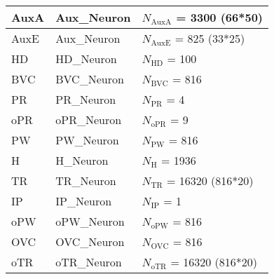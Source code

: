 \documentclass{article}
\begin{document}
\begin{tabularx}{\linewidth}{|l|l|X|}
    AuxA             & Aux\_Neuron        & $N_{\text{AuxA}}$ = 3300 (66*50)  \\ \hline

    AuxE             & Aux\_Neuron        & $N_{\text{AuxE}}$ = 825 (33*25)  \\ \hline

    HD             & HD\_Neuron        & $N_{\text{HD}}$ = 100  \\ \hline

    BVC             & BVC\_Neuron        & $N_{\text{BVC}}$ = 816  \\ \hline

    PR             & PR\_Neuron        & $N_{\text{PR}}$ = 4  \\ \hline

    oPR             & oPR\_Neuron        & $N_{\text{oPR}}$ = 9  \\ \hline

    PW             & PW\_Neuron        & $N_{\text{PW}}$ = 816  \\ \hline

    H             & H\_Neuron        & $N_{\text{H}}$ = 1936  \\ \hline

    TR             & TR\_Neuron        & $N_{\text{TR}}$ = 16320 (816*20)  \\ \hline

    IP             & IP\_Neuron        & $N_{\text{IP}}$ = 1  \\ \hline

    oPW             & oPW\_Neuron        & $N_{\text{oPW}}$ = 816  \\ \hline

    OVC             & OVC\_Neuron        & $N_{\text{OVC}}$ = 816  \\ \hline

    oTR             & oTR\_Neuron        & $N_{\text{oTR}}$ = 16320 (816*20)  \\ \hline

\end{tabularx}

\vspace{2ex}
\end{document}
